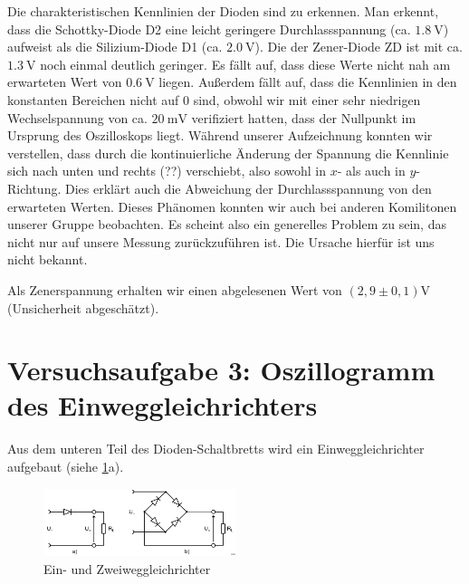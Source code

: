 Die charakteristischen Kennlinien der Dioden sind zu erkennen. 
Man erkennt, dass die Schottky-Diode D2 eine leicht geringere Durchlassspannung (ca. $\SI{1,8}{\volt}$) aufweist als die Silizium-Diode D1 (ca. $\SI{2,0}{\volt}$).
Die der Zener-Diode ZD ist mit ca. $\SI{1,3}{\volt}$ noch einmal deutlich geringer.
Es fällt auf, dass diese Werte nicht nah am erwarteten Wert von $\SI{0,6}{\volt}$ liegen.
Außerdem fällt auf, dass die Kennlinien in den konstanten Bereichen nicht auf 0 sind, 
obwohl wir mit einer sehr niedrigen Wechselspannung von ca. $\SI{20}{\milli\volt}$ verifiziert hatten, dass der Nullpunkt im Ursprung des Oszilloskops liegt.
Während unserer Aufzeichnung konnten wir verstellen, dass durch die kontinuierliche Änderung der Spannung die Kennlinie sich nach unten und rechts (??) verschiebt,
also sowohl in $x$- als auch in $y$-Richtung.
Dies erklärt auch die Abweichung der Durchlassspannung von den erwarteten Werten.
Dieses Phänomen konnten wir auch bei anderen Komilitonen unserer Gruppe beobachten. 
Es scheint also ein generelles Problem zu sein, das nicht nur auf unsere Messung zurückzuführen ist.
Die Ursache hierfür ist uns nicht bekannt.

Als Zenerspannung erhalten wir einen abgelesenen Wert von $(2,9 \pm 0,1)\si{\volt}$ (Unsicherheit abgeschätzt).


\section{Versuchsaufgabe 3: Oszillogramm des Einweggleichrichters}

Aus dem unteren Teil des Dioden-Schaltbretts wird ein Einweggleichrichter aufgebaut (siehe \ref{fig:3_gleichrichter}a).

\begin{figure}[H]
    \centering
    \includegraphics[width=0.5\textwidth]{figs/3/gleichrichter.png}
    \caption{Ein- und Zweiweggleichrichter}
    \label{fig:3_gleichrichter}
\end{figure}

